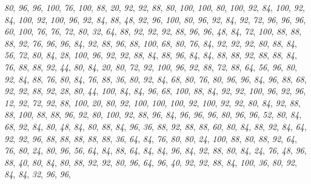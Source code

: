 \documentclass[
]{book}
\begin{document}
\emph{80}, \emph{96}, \emph{96}, \emph{100}, \emph{76}, \emph{100}, \emph{88}, \emph{20}, \emph{92}, \emph{92}, \emph{88}, \emph{80}, \emph{100}, \emph{100}, \emph{80}, \emph{100}, \emph{92}, \emph{84}, \emph{100}, \emph{92}, \emph{84}, \emph{100}, \emph{92}, \emph{100}, \emph{96}, \emph{92}, \emph{84}, \emph{88}, \emph{48}, \emph{92}, \emph{96}, \emph{100}, \emph{80}, \emph{96}, \emph{92}, \emph{84}, \emph{92}, \emph{72}, \emph{96}, \emph{96}, \emph{96}, \emph{60}, \emph{100}, \emph{76}, \emph{76}, \emph{72}, \emph{80}, \emph{32}, \emph{64}, \emph{88}, \emph{92}, \emph{92}, \emph{92}, \emph{88}, \emph{96}, \emph{96}, \emph{48}, \emph{84}, \emph{72}, \emph{100}, \emph{88}, \emph{88}, \emph{88}, \emph{92}, \emph{76}, \emph{96}, \emph{96}, \emph{84}, \emph{92}, \emph{88}, \emph{96}, \emph{88}, \emph{100}, \emph{68}, \emph{80}, \emph{76}, \emph{84}, \emph{92}, \emph{92}, \emph{92}, \emph{80}, \emph{88}, \emph{84}, \emph{56}, \emph{72}, \emph{80}, \emph{84}, \emph{28}, \emph{100}, \emph{96}, \emph{92}, \emph{92}, \emph{88}, \emph{84}, \emph{88}, \emph{96}, \emph{84}, \emph{84}, \emph{88}, \emph{88}, \emph{92}, \emph{88}, \emph{88}, \emph{84}, \emph{76}, \emph{88}, \emph{88}, \emph{92}, \emph{44}, \emph{80}, \emph{84}, \emph{20}, \emph{80}, \emph{72}, \emph{92}, \emph{100}, \emph{96}, \emph{92}, \emph{88}, \emph{72}, \emph{88}, \emph{64}, \emph{56}, \emph{96}, \emph{80}, \emph{92}, \emph{84}, \emph{88}, \emph{76}, \emph{80}, \emph{84}, \emph{76}, \emph{88}, \emph{36}, \emph{80}, \emph{92}, \emph{84}, \emph{68}, \emph{80}, \emph{76}, \emph{80}, \emph{96}, \emph{96}, \emph{84}, \emph{96}, \emph{88}, \emph{68}, \emph{92}, \emph{92}, \emph{88}, \emph{92}, \emph{28}, \emph{80}, \emph{44}, \emph{100}, \emph{84}, \emph{84}, \emph{96}, \emph{68}, \emph{100}, \emph{88}, \emph{84}, \emph{92}, \emph{92}, \emph{100}, \emph{96}, \emph{92}, \emph{96}, \emph{12}, \emph{92}, \emph{72}, \emph{92}, \emph{88}, \emph{100}, \emph{20}, \emph{80}, \emph{92}, \emph{100}, \emph{100}, \emph{100}, \emph{92}, \emph{100}, \emph{92}, \emph{92}, \emph{80}, \emph{84}, \emph{92}, \emph{88}, \emph{88}, \emph{100}, \emph{88}, \emph{88}, \emph{96}, \emph{92}, \emph{80}, \emph{100}, \emph{92}, \emph{88}, \emph{96}, \emph{84}, \emph{96}, \emph{96}, \emph{96}, \emph{80}, \emph{96}, \emph{96}, \emph{52}, \emph{80}, \emph{84}, \emph{68}, \emph{92}, \emph{84}, \emph{80}, \emph{48}, \emph{84}, \emph{80}, \emph{88}, \emph{84}, \emph{96}, \emph{36}, \emph{88}, \emph{92}, \emph{88}, \emph{88}, \emph{60}, \emph{80}, \emph{84}, \emph{88}, \emph{92}, \emph{84}, \emph{64}, \emph{92}, \emph{92}, \emph{96}, \emph{88}, \emph{88}, \emph{88}, \emph{88}, \emph{88}, \emph{36}, \emph{64}, \emph{84}, \emph{76}, \emph{80}, \emph{80}, \emph{24}, \emph{100}, \emph{88}, \emph{80}, \emph{88}, \emph{92}, \emph{64}, \emph{76}, \emph{80}, \emph{24}, \emph{80}, \emph{96}, \emph{56}, \emph{64}, \emph{84}, \emph{88}, \emph{64}, \emph{84}, \emph{84}, \emph{96}, \emph{84}, \emph{92}, \emph{88}, \emph{80}, \emph{84}, \emph{24}, \emph{76}, \emph{48}, \emph{96}, \emph{88}, \emph{40}, \emph{80}, \emph{84}, \emph{80}, \emph{88}, \emph{92}, \emph{92}, \emph{80}, \emph{96}, \emph{64}, \emph{96}, \emph{40}, \emph{92}, \emph{92}, \emph{88}, \emph{84}, \emph{100}, \emph{36}, \emph{80}, \emph{92}, \emph{84}, \emph{84}, \emph{32}, \emph{96}, \emph{96}, 
\end{document}
